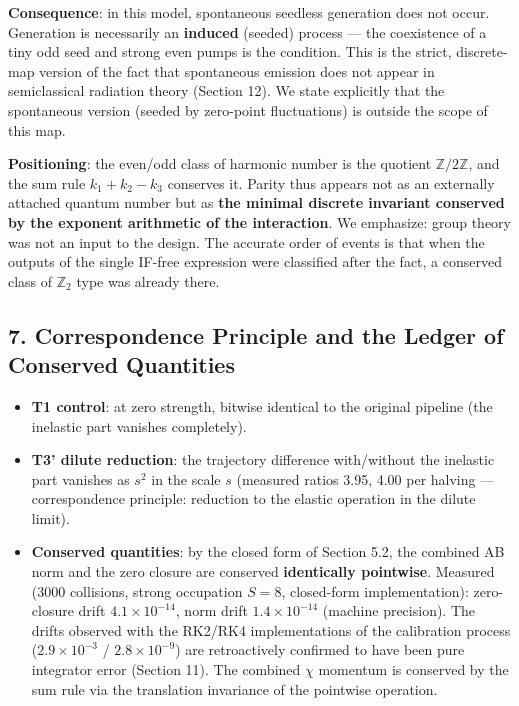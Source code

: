 \documentclass[
  a4paper,
]{article}
\providecommand{\tightlist}{%
  \setlength{\itemsep}{0pt}\setlength{\parskip}{0pt}}
\begin{document}
\textbf{Consequence}: in this model, spontaneous seedless generation
does not occur. Generation is necessarily an \textbf{induced} (seeded)
process --- the coexistence of a tiny odd seed and strong even pumps is
the condition. This is the strict, discrete-map version of the fact that
spontaneous emission does not appear in semiclassical radiation theory
(Section 12). We state explicitly that the spontaneous version (seeded
by zero-point fluctuations) is outside the scope of this map.

\textbf{Positioning}: the even/odd class of harmonic number is the
quotient \(\mathbb{Z}/2\mathbb{Z}\), and the sum rule \(k_1+k_2-k_3\)
conserves it. Parity thus appears not as an externally attached quantum
number but as \textbf{the minimal discrete invariant conserved by the
exponent arithmetic of the interaction}. We emphasize: group theory was
not an input to the design. The accurate order of events is that when
the outputs of the single IF-free expression were classified after the
fact, a conserved class of \(\mathbb{Z}_2\) type was already there.

\subsection{7. Correspondence Principle and the Ledger of Conserved
Quantities}\label{correspondence-principle-and-the-ledger-of-conserved-quantities}

\begin{itemize}
\tightlist
\item
  \textbf{T1 control}: at zero strength, bitwise identical to the
  original pipeline (the inelastic part vanishes completely).
\item
  \textbf{T3' dilute reduction}: the trajectory difference with/without
  the inelastic part vanishes as \(s^2\) in the scale \(s\) (measured
  ratios 3.95, 4.00 per halving --- correspondence principle: reduction
  to the elastic operation in the dilute limit).
\item
  \textbf{Conserved quantities}: by the closed form of Section 5.2, the
  combined AB norm and the zero closure are conserved
  \textbf{identically pointwise}. Measured (3000 collisions, strong
  occupation \(S=8\), closed-form implementation): zero-closure drift
  \(4.1\times10^{-14}\), norm drift \(1.4\times10^{-14}\) (machine
  precision). The drifts observed with the RK2/RK4 implementations of
  the calibration process (\(2.9\times10^{-3}\) / \(2.8\times10^{-9}\))
  are retroactively confirmed to have been pure integrator error
  (Section 11). The combined \(\chi\) momentum is conserved by the sum
  rule via the translation invariance of the pointwise operation.
\end{itemize}
\end{document}
